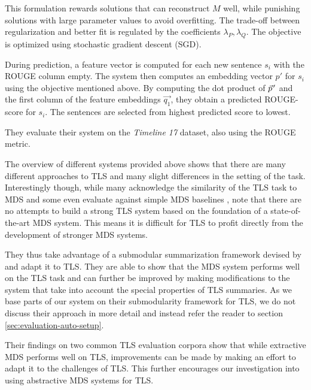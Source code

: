 \documentclass[a4paper,BCOR=10mm]{report}
\newcommand{\pvec}[1]{\vec{#1}\mkern2mu\vphantom{#1}}
\numberwithin{lemma}{chapter}
\numberwithin{definition}{chapter}
\begin{document}
This formulation rewards solutions that can reconstruct $M$ well, while punishing solutions with large parameter values to avoid overfitting. The trade-off between regularization and better fit is regulated by the coefficients $\lambda_P, \lambda_Q$.
The objective is optimized using stochastic gradient descent (SGD).

During prediction, a feature vector is computed for each new sentence $s_i$ with the ROUGE column empty. The system then computes an embedding vector $p'$ for $s_i$ using the objective mentioned above. By computing the dot product of $\pvec{p}'$ and the first column of the feature embeddings $\vec{q_1}$, they obtain a predicted ROUGE-score for $s_i$.
The sentences are selected from highest predicted score to lowest.

They evaluate their system on the \textit{Timeline 17} dataset, also using the ROUGE metric.


The overview of different systems provided above shows that there are many different approaches to TLS and many slight differences in the setting of the task. Interestingly though, while many acknowledge the similarity of the TLS task to MDS \citep{yan-trans, tran-headlines} and some even evaluate against simple MDS baselines \citep{yan-trans}, \citet{markert} note that there are no attempts to build a strong TLS system based on the foundation of a state-of-the-art MDS system. This means it is difficult for TLS to profit directly from the development of stronger MDS systems.

They thus take advantage of a submodular summarization framework devised by \citet{lin+bilmes} and adapt it to TLS.
They are able to show that the MDS system performs well on the TLS task and can further be improved by making modifications to the system that take into account the special properties of TLS summaries.
As we base parts of our system on their submodularity framework for TLS, we do not discuss their approach in more detail and instead refer the reader to section \ref{sec:evaluation-auto-setup}.

Their findings on two common TLS evaluation corpora show that while extractive MDS performs well on TLS, improvements can be made by making an effort to adapt it to the challenges of TLS.
This further encourages our investigation into using abstractive MDS systems for TLS.

\end{document}

